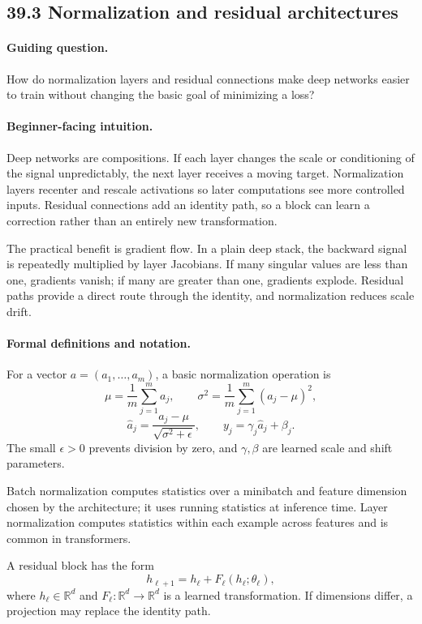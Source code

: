 \subsection{39.3 Normalization and residual architectures}

\paragraph{Guiding question.}
How do normalization layers and residual connections make deep networks easier to train without changing the basic goal of minimizing a loss?

\paragraph{Beginner-facing intuition.}
Deep networks are compositions. If each layer changes the scale or conditioning of the signal unpredictably, the next layer receives a moving target. Normalization layers recenter and rescale activations so later computations see more controlled inputs. Residual connections add an identity path, so a block can learn a correction rather than an entirely new transformation.

The practical benefit is gradient flow. In a plain deep stack, the backward signal is repeatedly multiplied by layer Jacobians. If many singular values are less than one, gradients vanish; if many are greater than one, gradients explode. Residual paths provide a direct route through the identity, and normalization reduces scale drift.

\paragraph{Formal definitions and notation.}
For a vector \(a=(a_1,\ldots,a_m)\), a basic normalization operation is
\[
\mu=\frac1m\sum_{j=1}^m a_j,\qquad
\sigma^2=\frac1m\sum_{j=1}^m(a_j-\mu)^2,
\]
\[
\widehat a_j=\frac{a_j-\mu}{\sqrt{\sigma^2+\epsilon}},
\qquad
y_j=\gamma_j\widehat a_j+\beta_j.
\]
The small \(\epsilon>0\) prevents division by zero, and \(\gamma,\beta\) are learned scale and shift parameters.

Batch normalization computes statistics over a minibatch and feature dimension chosen by the architecture; it uses running statistics at inference time. Layer normalization computes statistics within each example across features and is common in transformers.

A residual block has the form
\[
\boxed{h_{\ell+1}=h_\ell+F_\ell(h_\ell;\theta_\ell),}
\]
where \(h_\ell\in\mathbb{R}^d\) and \(F_\ell:\mathbb{R}^d\to\mathbb{R}^d\) is a learned transformation. If dimensions differ, a projection may replace the identity path.

